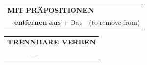 \documentclass[10pt,a4paper]{revtex4-2}
\begin{document}
\begin{verbbox-acc}
\vspace{10pt}

\begin{tabular}{lll}
\multicolumn{3}{l}{\textbf{MIT PRÄPOSITIONEN}}\\
& \textbf{entfernen aus} + Dat & (to remove from)\\
\end{tabular}
\hfill
\begin{tabular}{lll}
\multicolumn{3}{l}{\textbf{TRENNBARE VERBEN}}\\
& ---\\
\end{tabular}

\vspace{-5pt}
\end{verbbox-acc}

\end{document}
